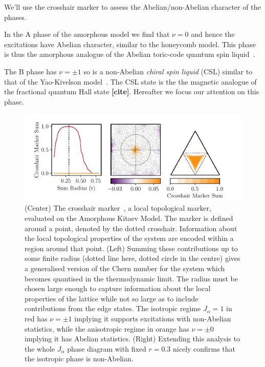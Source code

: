 We'll use the crosshair marker to assess the Abelian/non-Abelian character of the phases.

In the A phase of the amorphous model we find that \(\nu=0\) and hence the excitations have Abelian character, similar to the honeycomb model. This phase is thus the amorphous analogue of the Abelian toric-code quantum spin liquid~\autocite{kitaev_fault-tolerant_2003}.

The B phase has \(\nu=\pm1\) so is a non-Abelian \emph{chiral spin liquid} (CSL) similar to that of the Yao-Kivelson model~\autocite{yaoExactChiralSpin2007}. The CSL state is the the magnetic analogue of the fractional quantum Hall state \textbf{{[}cite{]}}. Hereafter we focus our attention on this phase.

\hypertarget{fig:phase_diagram_chern}{%
\begin{figure}
\centering
\includegraphics[width=1\textwidth,height=\textheight]{figure_code/amk_chapter/results/phase_diagram_chern/phase_diagram_chern}
\caption[{Local Chern Markers}]{(Center) The crosshair marker~\autocite{peru_preprint}, a local topological marker, evaluated on the Amorphous Kitaev Model. The marker is defined around a point, denoted by the dotted crosshair. Information about the local topological properties of the system are encoded within a region around that point. (Left) Summing these contributions up to some finite radius (dotted line here, dotted circle in the centre) gives a generalised version of the Chern number for the system which becomes quantised in the thermodynamic limit. The radius must be chosen large enough to capture information about the local properties of the lattice while not so large as to include contributions from the edge states. The isotropic regime \(J_\alpha = 1\) in red has \(\nu = \pm 1\) implying it supports excitations with non-Abelian statistics, while the anisotropic regime in orange has \(\nu = \pm 0\) implying it has Abelian statistics. (Right) Extending this analysis to the whole \(J_\alpha\) phase diagram with fixed \(r = 0.3\) nicely confirms that the isotropic phase is non-Abelian.}
\label{fig:phase_diagram_chern}
\end{figure}
}

